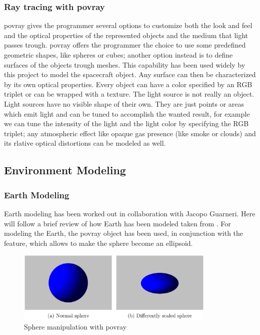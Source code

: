\subsubsection{Ray tracing with \acrshort{povray}}
\acrshort{povray} gives the programmer several options to customize both the look and feel and the optical properties of the represented objects and the medium that light passes trough.
\acrshort{povray} offers the programmer the choice to use some predefined geometric shapes, like spheres or cubes; another option instead is to define surfaces of the objects trough meshes. This capability has been used widely by this project to model the spacecraft object.
Any surface can then be characterized by its own optical properties. Every object can have a color specified by an RGB triplet or can be wrapped with a texture.
The light source is not really an object. Light sources have no visible shape of their own. They are just points or areas which emit light and can be tuned to accomplish the wanted result, for example we can tune the intensity of the light and the light color by specifying the RGB triplet; any atmospheric effect like opaque gas presence (like smoke or clouds) and its rlative optical distortions can be modeled as well.

\subsection{Environment Modeling}
\subsubsection{Earth Modeling}
Earth modeling has been worked out in collaboration with Jacopo Guarneri.
Here will follow a brief review of how Earth has been modeled taken from \cite{jacopo}.
For modeling the Earth, the \acrshort{povray}  object has been used, in conjunction with the  feature, which allows to make the sphere become an ellipsoid.

\begin{figure}
  \centering
  \includegraphics[width=0.85\textwidth]{gfx/sphere_scaling.eps}
  \caption{Sphere manipulation with \acrshort{povray} \cite{jacopo}}
  \label{fig:spherescaling}
\end{figure}

